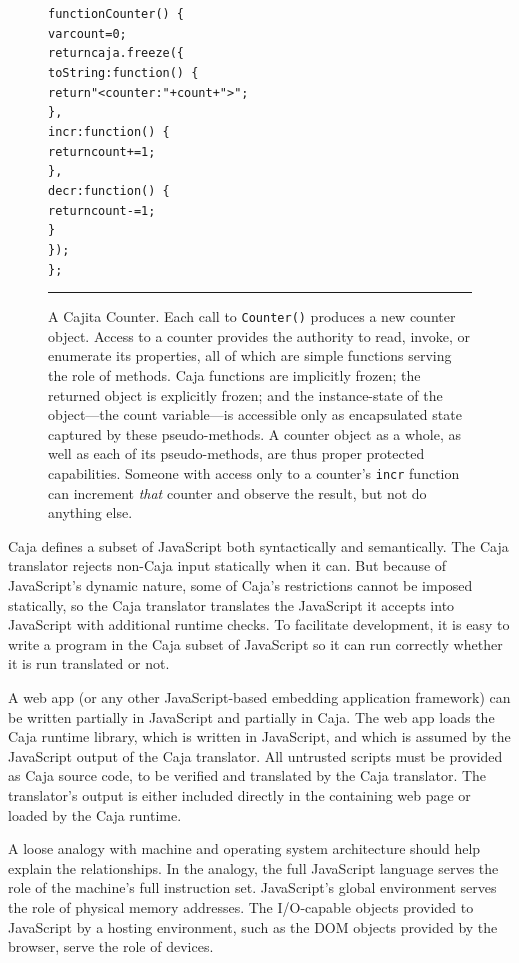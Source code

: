 \documentclass[letterpaper,twocolumn,10pt]{article}
\newcommand{\code}[1]{{\tt {#1}}}              %
\begin{document}
\begin{figure}[t!]
\begin{alltt}
function Counter()\ \{
  var count = 0;
  return caja.freeze(\{
    toString: function()\ \{ 
      return "<counter: " + count + ">"; 
    \},
    incr: function()\ \{ 
      return count += 1; 
    \},
    decr: function()\ \{ 
      return count -= 1; 
    \}
  \});
\};
\end{alltt}

\caption[A Cajita Counter.]{A Cajita Counter. Each call to \code{Counter()} 
produces a new counter object. Access to a counter provides the authority to 
read, invoke, or enumerate its properties, all of which are simple functions 
serving the role of methods. Caja functions are implicitly frozen; the 
returned object is explicitly frozen; and the instance-state of the 
object---the count variable---is accessible only as encapsulated state 
captured by these pseudo-methods. A counter object as a whole, as well as 
each of its pseudo-methods, are thus proper protected capabilities. Someone 
with access only to a counter's \code{incr} function can increment 
\emph{that} counter and observe the result, but not do anything else.
 \\ } \hrule
\label{fig:cajita-counter}
\end{figure}

Caja defines a subset of JavaScript both syntactically and semantically. The 
Caja translator rejects non-Caja input statically when it can. But because of 
JavaScript's dynamic nature, some of Caja's restrictions cannot be imposed 
statically, so the Caja translator translates the JavaScript it accepts into 
JavaScript with additional runtime checks. To facilitate development, it is 
easy to write a program in the Caja subset of JavaScript so it can run 
correctly whether it is run translated or not.

A web app (or any other JavaScript-based embedding application framework) can 
be written partially in JavaScript and partially in Caja. The web app loads 
the Caja runtime library, which is written in JavaScript, and which is 
assumed by the JavaScript output of the Caja translator. All untrusted 
scripts must be provided as Caja source code, to be verified and translated 
by the Caja translator. The translator's output is either included directly 
in the containing web page or loaded by the Caja runtime.

A loose analogy with machine and operating system architecture should help 
explain the relationships. In the analogy, the full JavaScript language 
serves the role of the machine's full instruction set. JavaScript's global 
environment serves the role of physical memory addresses. The I/O-capable 
objects provided to JavaScript by a hosting environment, such as the DOM 
objects provided by the browser, serve the role of devices.
\end{document}

